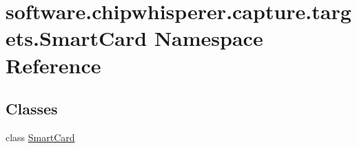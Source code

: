 \hypertarget{namespacesoftware_1_1chipwhisperer_1_1capture_1_1targets_1_1SmartCard}{}\section{software.\+chipwhisperer.\+capture.\+targets.\+Smart\+Card Namespace Reference}
\label{namespacesoftware_1_1chipwhisperer_1_1capture_1_1targets_1_1SmartCard}
\subsection*{Classes}
\begin{DoxyCompactItemize}
\item 
class \hyperlink{classsoftware_1_1chipwhisperer_1_1capture_1_1targets_1_1SmartCard_1_1SmartCard}{Smart\+Card}
\end{DoxyCompactItemize}
